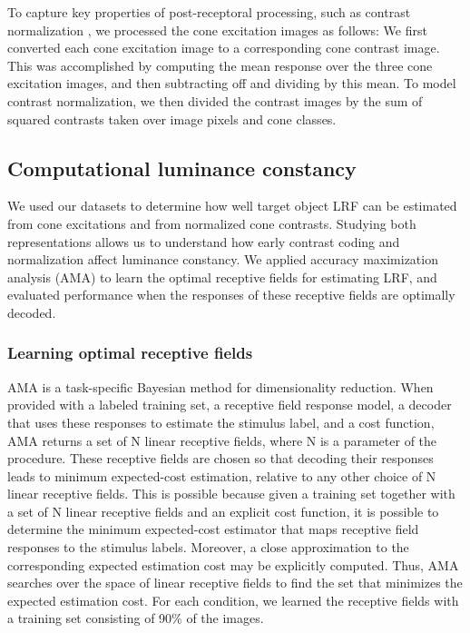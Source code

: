 \documentclass{jov}
\begin{document}
To capture key properties of post-receptoral processing, such as contrast normalization \cite{heeger1992normalization,albrecht1991motion,carandini2012normalization}, 
we processed the cone excitation images as follows:
We first converted each cone excitation image to a corresponding cone contrast image.
This was accomplished by computing the mean response over the three cone excitation images, and then subtracting off and dividing by this mean.
To model contrast normalization, we then divided the contrast images by the sum of squared contrasts taken over image pixels and cone classes.

\subsection{Computational luminance constancy} \label{method:SupervisedLearning}
We used our datasets to determine how well target object LRF can be estimated from cone excitations and from normalized cone contrasts.
Studying both representations allows us to understand how early contrast coding and normalization affect luminance constancy.
We applied accuracy maximization analysis (AMA) to learn the optimal receptive fields for estimating LRF,
and evaluated performance when the responses of these receptive fields are optimally decoded.

\subsubsection*{Learning optimal receptive fields}
AMA is a task-specific Bayesian method for dimensionality reduction.
When provided with a labeled training set, a receptive field response model, a decoder that uses these responses to estimate the stimulus label, and a cost function, AMA returns a set of N linear receptive fields, where N is a parameter of the procedure.
These receptive fields are chosen so that decoding their responses leads to minimum expected-cost estimation, relative to any other choice of N linear receptive fields.
This is possible because given a training set together with a set of N linear receptive fields and an explicit cost function, it is possible to determine the minimum expected-cost estimator that maps receptive field responses to the stimulus labels.
Moreover, a close approximation to the corresponding expected estimation cost may be explicitly computed.
Thus, AMA searches over the space of linear receptive fields to find the set that minimizes the expected estimation cost.
For each condition, we learned the receptive fields with a training set consisting of 90\% of the images.
\end{document}
